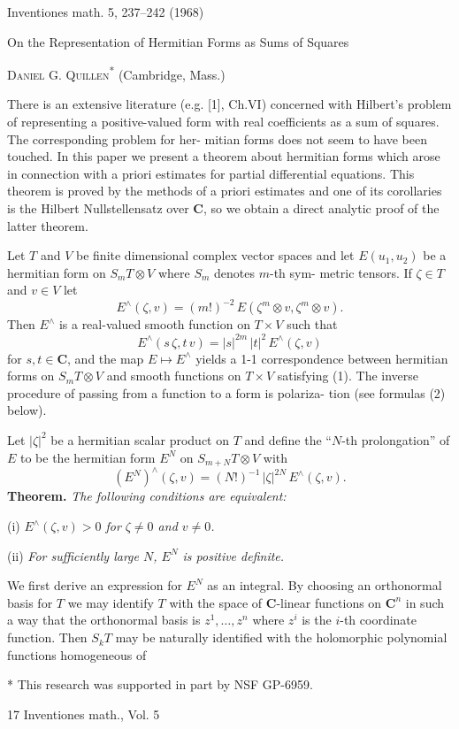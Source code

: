 Inventiones math. 5, 237--242 (1968)

On the Representation of Hermitian Forms
as Sums of Squares

\textsc{Daniel G. Quillen}\textsuperscript{*} (Cambridge, Mass.)

There is an extensive literature (e.g. [1], Ch.VI) concerned with
Hilbert's problem of representing a positive-valued form with real
coefficients as a sum of squares. The corresponding problem for her-%
mitian forms does not seem to have been touched. In this paper we
present a theorem about hermitian forms which arose in connection
with a priori estimates for partial differential equations. This theorem is
proved by the methods of a priori estimates and one of its corollaries
is the Hilbert Nullstellensatz over $\mathbf{C}$, so we obtain a direct analytic proof
of the latter theorem.

Let $T$ and $V$ be finite dimensional complex vector spaces and let
$E(u_1,u_2)$ be a hermitian form on $S_m T\otimes V$ where $S_m$ denotes $m$-th sym-%
metric tensors. If $\zeta\in T$ and $v\in V$ let
\[ E^{\wedge}(\zeta,v)=(m!)^{-2}\,E(\zeta^m\otimes v,\zeta^m\otimes v). \]
Then $E^{\wedge}$ is a real-valued smooth function on $T\times V$ such that
\[ E^{\wedge}(s\,\zeta,t\,v)=|s|^{2m}\,|t|^2\,E^{\wedge}(\zeta,v) \tag{1} \]
for $s,t\in\mathbf{C}$, and the map $E\mapsto E^{\wedge}$ yields a 1-1 correspondence between
hermitian forms on $S_m T\otimes V$ and smooth functions on $T\times V$ satisfying (1).
The inverse procedure of passing from a function to a form is polariza-%
tion (see formulas (2) below).

Let $|\zeta|^2$ be a hermitian scalar product on $T$ and define the ``$N$-th
prolongation'' of $E$ to be the hermitian form $E^N$ on $S_{m+N}T\otimes V$ with
\[ (E^N)^{\wedge}(\zeta,v)=(N!)^{-1}\,|\zeta|^{2N}\,E^{\wedge}(\zeta,v). \]
\textbf{Theorem.} \emph{The following conditions are equivalent:}

(i) \emph{$E^{\wedge}(\zeta,v)>0$ for $\zeta\neq 0$ and $v\neq 0$.}

(ii) \emph{For sufficiently large $N$, $E^N$ is positive definite.}

We first derive an expression for $E^N$ as an integral. By choosing an
orthonormal basis for $T$ we may identify $T$ with the space of $\mathbf{C}$-linear
functions on $\mathbf{C}^n$ in such a way that the orthonormal basis is $z^1,\dots,z^n$
where $z^i$ is the $i$-th coordinate function. Then $S_k T$ may be naturally
identified with the holomorphic polynomial functions homogeneous of

* This research was supported in part by NSF GP-6959.

17 Inventiones math., Vol. 5

